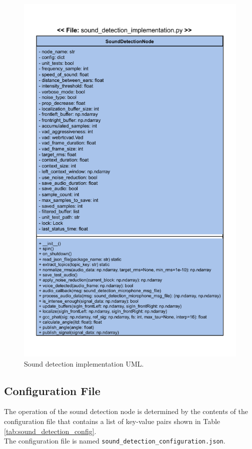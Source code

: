 \documentclass{CSSRforAfrica}
\begin{document}
\begin{figure}[!hbpt]
	\centering
	\includegraphics[scale=1.0]{images/Sound_implementation_UML.pdf}
	\caption{Sound detection implementation UML.}
	\label{fig:sound_implementation_UML}
\end{figure}

\newpage 


\subsection*{Configuration File}
The operation of the sound detection node is determined by the contents of the configuration file that contains a list of key-value pairs shown in Table \ref{tab:sound_detection_config}.\\
The configuration file is named \texttt{sound\_detection\_configuration.json}. 
\end{document}
